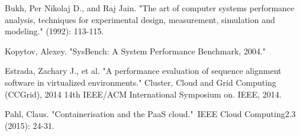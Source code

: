 \documentclass[11pt]{article}
\begin{document}
\begin{thebibliography}{99}
	Bukh, Per Nikolaj D., and Raj Jain. "The art of computer systems performance analysis, techniques for experimental design, measurement, simulation and modeling." (1992): 113-115.
	
	Kopytov, Alexey. "SysBench: A System Performance Benchmark, 2004."
	
	Estrada, Zachary J., et al. "A performance evaluation of sequence alignment software in virtualized environments." Cluster, Cloud and Grid Computing (CCGrid), 2014 14th IEEE/ACM International Symposium on. IEEE, 2014.

	Pahl, Claus. "Containerisation and the PaaS cloud." IEEE Cloud Computing2.3 (2015): 24-31.

\end{thebibliography}
\end{document}
